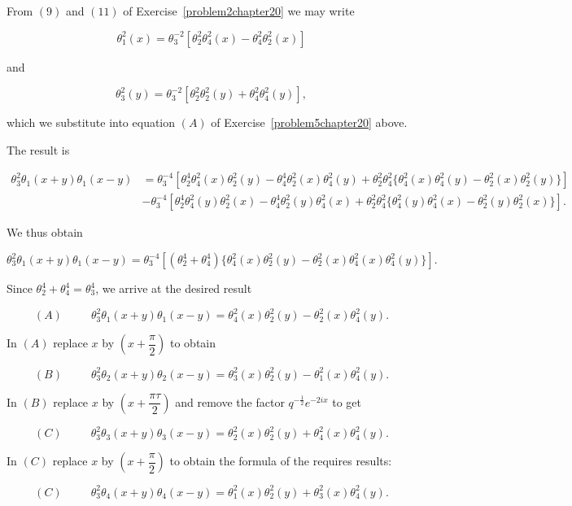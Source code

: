 \begin{solution}
From $(9)$ and $(11)$ of Exercise~\ref{problem2chapter20} we may write

$$\theta_1^2(x) = \theta_3^{-2} [\theta_2^2 \theta_4^2(x) - \theta_4^2 \theta_2^2(x)]$$

and

$$\theta_3^2(y) = \theta_3^{-2} [\theta_2^2 \theta_2^2(y) + \theta_4^2 \theta_4^2(y)],$$

which we substitute into equation $(A)$ of Exercise~\ref{problem5chapter20} above.

The result is

$$\begin{array}{ll}
\theta_3^2 \theta_1(x+y) \theta_1(x-y) &= \theta_3^{-4} [\theta_2^4 \theta_4^2(x) \theta_2^2(y) - \theta_4^4 \theta_2^2 (x) \theta_4^2(y) + \theta_2^2 \theta_4^2 \{  \theta_4^2(x) \theta_4^2(y) - \theta_2^2 (x) \theta_2^2(y) \} ] \\
&- \theta_3^{-4} [\theta_2^4 \theta_4^2(y) \theta_2^2(x) -\theta_4^4 \theta_2^2(y) \theta_4^2(x) + \theta_2^2\theta_4^2\{\theta_4^2(y) \theta_4^2(x) - \theta_2^2(y) \theta_2^2(x) \} ]. 
\end{array}$$

We thus obtain

$$\theta_3^2 \theta_1(x+y) \theta_1(x-y) = \theta_3^{-4} [(\theta_2^4+\theta_4^4) \{ \theta_4^2(x) \theta_2^2(y) - \theta_2^2(x) \theta_4^2(x) \theta_4^2(y) \} ].$$

Since $\theta_2^4 + \theta_4^4 = \theta_3^4$, we arrive at the desired result

$$(A) \hspace{30pt} \theta_3^2\theta_1(x+y) \theta_1(x-y) = \theta_4^2(x) \theta_2^2(y) - \theta_2^2(x) \theta_4^2(y).$$

In $(A)$ replace $x$ by $\left( x + \dfrac{\pi}{2} \right)$ to obtain

$$(B) \hspace{30pt} \theta_3^2 \theta_2(x+y) \theta_2(x-y) = \theta_3^2(x) \theta_2^2(y) -\theta_1^2(x) \theta_4^2(y).$$

In $(B)$ replace $x$ by $\left( x + \dfrac{\pi \tau}{2} \right)$ and remove the factor $q^{-\frac{1}{2}} e^{-2ix}$ to get

$$(C) \hspace{30pt} \theta_3^2 \theta_3(x+y) \theta_3(x-y) = \theta_2^2(x) \theta_2^2(y) + \theta_4^2(x) \theta_4^2(y).$$

In $(C)$ replace $x$ by $\left( x + \dfrac{\pi}{2} \right)$ to obtain the formula of the requires results:

$$(C) \hspace{30pt} \theta_3^2 \theta_4(x+y) \theta_4(x-y) = \theta_1^2(x) \theta_2^2(y) + \theta_3^2(x) \theta_4^2(y).$$
\end{solution}
